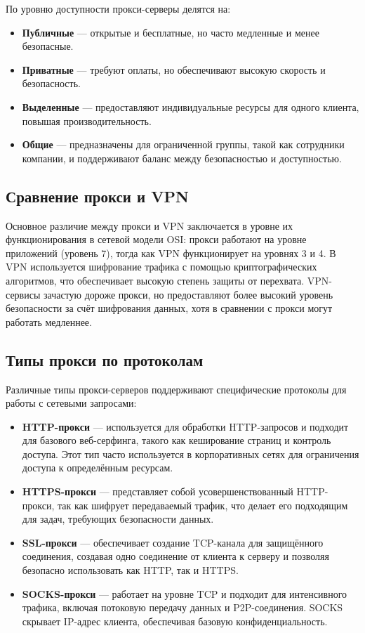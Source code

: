 \documentclass{SCWorks}
\begin{document}
По уровню доступности прокси-серверы делятся на:
\begin{itemize}
    \item \textbf{Публичные} — открытые и бесплатные, но часто медленные и менее безопасные.
    \item \textbf{Приватные} — требуют оплаты, но обеспечивают высокую скорость и безопасность.
    \item \textbf{Выделенные} — предоставляют индивидуальные ресурсы для одного клиента, повышая производительность.
    \item \textbf{Общие} — предназначены для ограниченной группы, такой как сотрудники компании, и поддерживают баланс между безопасностью и доступностью.
\end{itemize}

\subsection{Сравнение прокси и VPN}

Основное различие между прокси и VPN заключается в уровне их функционирования в сетевой модели OSI: прокси работают на уровне приложений (уровень 7), тогда как VPN функционирует на уровнях 3 и 4. В VPN используется шифрование трафика с помощью криптографических алгоритмов, что обеспечивает высокую степень защиты от перехвата. VPN-сервисы зачастую дороже прокси, но предоставляют более высокий уровень безопасности за счёт шифрования данных, хотя в сравнении с прокси могут работать медленнее.

\subsection{Типы прокси по протоколам}

Различные типы прокси-серверов поддерживают специфические протоколы для работы с сетевыми запросами:
\begin{itemize}
    \item \textbf{HTTP-прокси} — используется для обработки HTTP-запросов и подходит для базового веб-серфинга, такого как кеширование страниц и контроль доступа. Этот тип часто используется в корпоративных сетях для ограничения доступа к определённым ресурсам.
    \item \textbf{HTTPS-прокси} — представляет собой усовершенствованный HTTP-прокси, так как шифрует передаваемый трафик, что делает его подходящим для задач, требующих безопасности данных.
    \item \textbf{SSL-прокси} — обеспечивает создание TCP-канала для защищённого соединения, создавая одно соединение от клиента к серверу и позволяя безопасно использовать как HTTP, так и HTTPS.
    \item \textbf{SOCKS-прокси} — работает на уровне TCP и подходит для интенсивного трафика, включая потоковую передачу данных и P2P-соединения. SOCKS скрывает IP-адрес клиента, обеспечивая базовую конфиденциальность.
\end{itemize}
\end{document}

